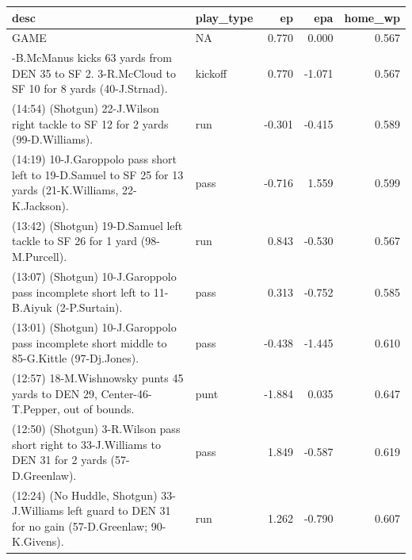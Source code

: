 \documentclass[
  11pt,
]{book}
\theoremstyle{definition}
\theoremstyle{definition}
\theoremstyle{definition}
\theoremstyle{definition}
\theoremstyle{remark}
\begin{document}
\begin{tabular}{>{\raggedright\arraybackslash}p{3.5in}lrrr}
\toprule
desc & play\_type & ep & epa & home\_wp\\
\midrule
GAME & NA & 0.770 & 0.000 & 0.567\\
8-B.McManus kicks 63 yards from DEN 35 to SF 2. 3-R.McCloud to SF 10 for 8 yards (40-J.Strnad). & kickoff & 0.770 & -1.071 & 0.567\\
(14:54) (Shotgun) 22-J.Wilson right tackle to SF 12 for 2 yards (99-D.Williams). & run & -0.301 & -0.415 & 0.589\\
(14:19) 10-J.Garoppolo pass short left to 19-D.Samuel to SF 25 for 13 yards (21-K.Williams, 22-K.Jackson). & pass & -0.716 & 1.559 & 0.599\\
(13:42) (Shotgun) 19-D.Samuel left tackle to SF 26 for 1 yard (98-M.Purcell). & run & 0.843 & -0.530 & 0.567\\
\addlinespace
(13:07) (Shotgun) 10-J.Garoppolo pass incomplete short left to 11-B.Aiyuk (2-P.Surtain). & pass & 0.313 & -0.752 & 0.585\\
(13:01) (Shotgun) 10-J.Garoppolo pass incomplete short middle to 85-G.Kittle (97-Dj.Jones). & pass & -0.438 & -1.445 & 0.610\\
(12:57) 18-M.Wishnowsky punts 45 yards to DEN 29, Center-46-T.Pepper, out of bounds. & punt & -1.884 & 0.035 & 0.647\\
(12:50) (Shotgun) 3-R.Wilson pass short right to 33-J.Williams to DEN 31 for 2 yards (57-D.Greenlaw). & pass & 1.849 & -0.587 & 0.619\\
(12:24) (No Huddle, Shotgun) 33-J.Williams left guard to DEN 31 for no gain (57-D.Greenlaw; 90-K.Givens). & run & 1.262 & -0.790 & 0.607\\
\bottomrule
\end{tabular}

\newpage
\end{document}
